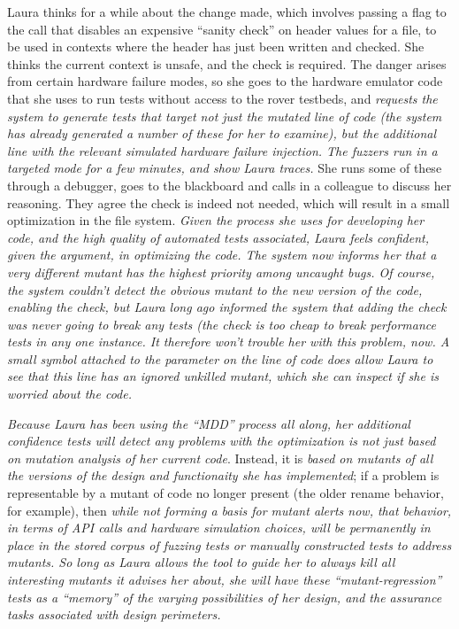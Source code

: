 Laura thinks for a while about the change made, which involves passing a flag to the call that disables an expensive ``sanity check'' on header values for a file, to be used in contexts where the header has just been written and checked.  She thinks the current context is unsafe, and the check is required.  The danger arises from certain hardware failure modes, so she goes to the hardware emulator code that she uses to run tests without access to the rover testbeds, and \emph{requests the system to generate tests that target not just the mutated line of code (the system has already generated a number of these for her to examine), but the additional line with the relevant simulated hardware failure injection.  The fuzzers run in a targeted mode for a few minutes, and show Laura traces.}  She runs some of these through a debugger, goes to the blackboard and calls in a colleague to discuss her reasoning.  They agree the check is indeed not needed, which will result in a small optimization in the file system.  \emph{Given the process she uses for developing her code, and the high quality of automated tests associated, Laura feels confident, given the argument, in optimizing the code.  The system now informs her that a very different mutant has the highest priority among uncaught bugs.  Of course, the system couldn't detect the obvious mutant to the new version of the code, enabling the check, but Laura long ago informed the system that adding the check was never going to break any tests (the check is too cheap to break performance tests in any one instance.  It therefore won't trouble her with this problem, now.  A small symbol attached to the parameter on the line of code does allow Laura to see that this line has an ignored unkilled mutant, which she can inspect if she is worried about the code.}

    \emph{Because Laura has been using the ``MDD'' process all along, her additional confidence tests will detect any problems with the optimization is not just based on mutation analysis of her current code}.  Instead, it is \emph{based on mutants of all the versions of the design and functionaity she has implemented}; if a problem is representable by a mutant of code no longer present (the older rename behavior, for example), then \emph{while not forming a basis for mutant alerts now, that behavior, in terms of API calls and hardware simulation choices, will be permanently in place in the stored corpus of fuzzing tests or manually constructed tests to address mutants.  So long as Laura allows the tool to guide her to always kill all interesting mutants it advises her about, she will have these ``mutant-regression'' tests as a ``memory'' of the varying possibilities of her design, and the assurance tasks associated with design perimeters.}
